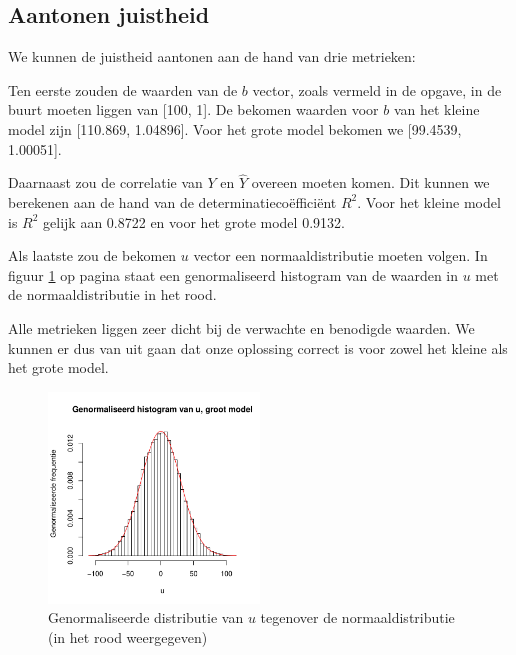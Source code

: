 \documentclass[a4paper,12pt]{report}
\begin{document}
\subsection{Aantonen juistheid}
We kunnen de juistheid aantonen aan de hand van drie metrieken:

Ten eerste zouden de waarden van de $b$ vector, zoals vermeld in de opgave, in de buurt moeten liggen van [100, 1]. De bekomen waarden voor $b$ van het kleine model zijn [110.869, 1.04896]. Voor het grote model bekomen we [99.4539, 1.00051].

Daarnaast zou de correlatie van $Y$ en $\hat{Y}$ overeen moeten komen. Dit kunnen we berekenen aan de hand van de determinatieco\"effici\"ent $R^2$. Voor het kleine model is $R^2$ gelijk aan 0.8722 en voor het grote model 0.9132.

Als laatste zou de bekomen $u$ vector een normaaldistributie moeten volgen. In figuur \ref{Udistr} op pagina \pageref{Udistr} staat een genormaliseerd histogram van de waarden in $u$ met de normaaldistributie in het rood. 

Alle metrieken liggen zeer dicht bij de verwachte en benodigde waarden. We kunnen er dus van uit gaan dat onze oplossing correct is voor zowel het kleine als het grote model.

\begin{figure}
    \centering
    \includegraphics[width=0.5\textwidth]{includes/u-big}
    \caption{Genormaliseerde distributie van $u$ tegenover de normaaldistributie (in het rood weergegeven)}
    \label{Udistr}
\end{figure}
\end{document}
